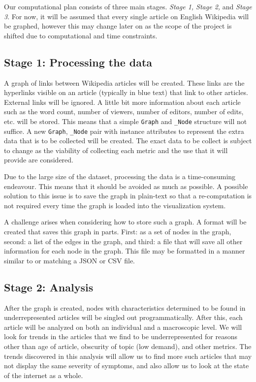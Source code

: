 \documentclass[fontsize=12pt]{article}
\begin{document}
\begin{multicols}{2}
    Our computational plan consists of three main stages.
    \textit{Stage 1, Stage 2,} and \textit{Stage 3}.
    For now, it will be assumed that every single article on English Wikipedia will be graphed, however this may change later on as the scope of the project is shifted due to computational and time constraints.

    \subsection{Stage 1: Processing the data}
    A graph of links between Wikipedia articles will be created.
    These links are the hyperlinks visible on an article (typically in blue text) that link to other articles.
    External links will be ignored.
    A little bit more information about each article such as the word count, number of viewers, number of editors, number of edits, etc. will be stored.
    This means that a simple \texttt{Graph} and \texttt{\_Node} structure will not suffice.
    A new \texttt{Graph}, \texttt{\_Node} pair with instance attributes to represent the extra data that is to be collected will be created.
    The exact data to be collect is subject to change as the viability of collecting each metric and the use that it will provide are considered.

    Due to the large size of the dataset, processing the data is a time-consuming endeavour.
    This means that it should be avoided as much as possible.
    A possible solution to this issue is to save the graph in plain-text so that a re-computation is not required every time the graph is loaded into the visualization system.

    A challenge arises when considering how to store such a graph.
    A format will be created that saves this graph in parts.
    First: as a set of nodes in the graph, second: a list of the edges in the graph, and third: a file that will save all other information for each node in the graph.
    This file may be formatted in a manner similar to or matching a JSON or CSV file.

    \subsection{Stage 2: Analysis}
    After the graph is created, nodes with characteristics determined to be found in underrepresented articles will be singled out programmatically.
    After this, each article will be analyzed on both an individual and a macroscopic level.
    We will look for trends in the articles that we find to be underrepresented for reasons other than age of article, obscurity of topic (low demand), and other metrics.
    The trends discovered in this analysis will allow us to find more such articles that may not display the same severity of symptoms, and also allow us to look at the state of the internet as a whole.


\end{multicols}
\end{document}
